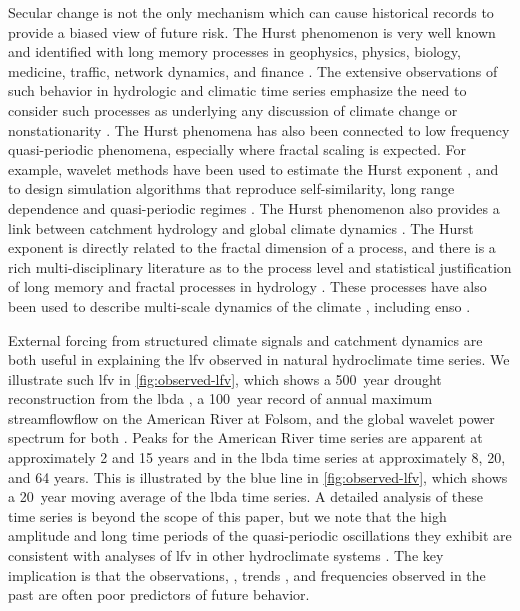 \documentclass[
  draft,
  linenumbers
]{agujournal2019}
\begin{document}
Secular change is not the only mechanism which can cause historical records to provide a biased view of future risk.
The Hurst phenomenon is very well known and identified with long memory processes in geophysics, physics, biology, medicine, traffic, network dynamics, and finance \citep{oconnell:2016}.
The extensive observations of such behavior in hydrologic and climatic time series emphasize the need to consider such processes as underlying any discussion of climate change or nonstationarity \citep{koutsoyiannis:2003,markonis:2013,Palmer:1993ef}.
The Hurst phenomena has also been connected to low frequency quasi-periodic phenomena, especially where fractal scaling is expected.
For example, wavelet methods have been used to estimate the Hurst exponent \citep{simonsen:1998,chamoli:2007}, and to design simulation algorithms that reproduce self-similarity, long range dependence and quasi-periodic regimes \citep{Kwon:2007fj,bullmore:2001,geweke:1983,feng:2005}.
The Hurst phenomenon also provides a link between catchment hydrology and global climate dynamics \citep{bloschl:2010,montanari:2003}.
The Hurst exponent is directly related to the fractal dimension of a process, and there is a rich multi-disciplinary literature as to the process level and statistical justification of long memory and fractal processes in hydrology \citep{mandelbrot:1985,mandelbrot:1969,beran:1994}.
These processes have also been used to describe multi-scale dynamics of the climate \citep{lovejoy:2012,lovejoy:2013a,lovejoy:2013,selvam:2017}, including \gls{enso} \citep{maruyama:2018,zivkovic:2013}.

External forcing from structured climate signals \citep[``teleconnections'';][]{Angstrom:1935ej} and catchment dynamics are both useful in explaining the \gls{lfv} observed in natural hydroclimate time series.
We illustrate such \gls{lfv} in \cref{fig:observed-lfv}, which shows a \SI{500}{year} drought reconstruction from the \gls{lbda} \citep{Cook:2010bz}, a \SI{100}{year} record of annual maximum streamflowflow on the American River at Folsom, and the global wavelet power spectrum for both \citep{Torrence:1998jp,Roesch:wlBQQoIs}.
Peaks for the American River time series are apparent at approximately 2 and 15 years and in the \gls{lbda} time series at approximately 8, 20, and 64 years.
This is illustrated by the blue line in  \cref{fig:observed-lfv}, which shows a \SI{20}{year} moving average of the \gls{lbda} time series.
A detailed analysis of these time series is beyond the scope of this paper, but we note that the high amplitude and long time periods of the quasi-periodic oscillations they exhibit are consistent with analyses of \gls{lfv} in other hydroclimate systems \citep{Kiem:2002kq,Swierczynski:2012km,Woollings:2014kd,Hodgkins:2017hw}.
The key implication is that the observations, \citep{Jain:2001hz}, trends \citep{bhattacharya:1983}, and frequencies \citep{newman:2016} observed in the past are often poor predictors of future behavior.
\end{document}
